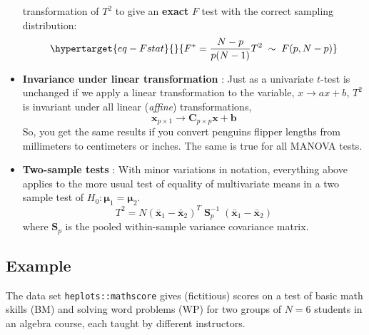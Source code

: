 \documentclass[
  letterpaper,
  10pt,
  krantz2]{krantz}
\makeatletter
\newenvironment{Shaded}{\begin{snugshade}}{\end{snugshade}}
\newcommand{\AttributeTok}[1]{\textcolor[rgb]{0.40,0.45,0.13}{#1}}
\newcommand{\CommentTok}[1]{\textcolor[rgb]{0.37,0.37,0.37}{#1}}
\newcommand{\FunctionTok}[1]{\textcolor[rgb]{0.28,0.35,0.67}{#1}}
\newcommand{\NormalTok}[1]{\textcolor[rgb]{0.00,0.23,0.31}{#1}}
\newcommand{\StringTok}[1]{\textcolor[rgb]{0.13,0.47,0.30}{#1}}
\newenvironment{kframe}{%
  \medskip{}
  \setlength{\fboxsep}{.8em}
  \def\at@end@of@kframe{}%
  \ifinner\ifhmode%
  \def\at@end@of@kframe{\end{minipage}}%
  \begin{minipage}{\columnwidth}%
  \fi\fi%
  \def\FrameCommand##1{\hskip\@totalleftmargin \hskip-\fboxsep
  \colorbox{shadecolor}{##1}\hskip-\fboxsep
      \hskip-\linewidth \hskip-\@totalleftmargin \hskip\columnwidth}%
  \MakeFramed {\advance\hsize-\width
    \@totalleftmargin\z@ \linewidth\hsize
    \@setminipage}}%
{\par\unskip\endMakeFramed%
  \at@end@of@kframe}
\renewenvironment{Shaded}{\begin{kframe}}{\end{kframe}}
\makeatother
\begin{document}
\begin{itemize}
  transformation of \(T^2\) to give an \textbf{exact} \(F\) test with
  the correct sampling distribution:
  \begin{equation}\protect\hypertarget{eq-Fstat}{}{
  F^* = \frac{N - p}{p (N-1)} T^2 \; \sim \; F (p, N - p)
  }\label{eq-Fstat}\end{equation}
\item
  \textbf{Invariance under linear transformation} : Just as a univariate
  \(t\)-test is unchanged if we apply a linear transformation to the
  variable, \(x \rightarrow a x + b\), \(T^2\) is invariant under all
  linear (\emph{affine}) transformations, \[
  \mathbf{x}_{p \times 1} \rightarrow \mathbf{C}_{p \times p} \mathbf{x} + \mathbf{b}
  \] So, you get the same results if you convert penguins flipper
  lengths from millimeters to centimeters or inches. The same is true
  for all MANOVA tests.
\item
  \textbf{Two-sample tests} : With minor variations in notation,
  everything above applies to the more usual test of equality of
  multivariate means in a two sample test of
  \(H_0 : \mathbf{\mu}_1 = \mathbf{\mu}_2\). \[
  T^2 = N (\bar{\mathbf{x}}_1 - \bar{\mathbf{x}}_2)^T \; \mathbf{S}_p^{-1} \; (\bar{\mathbf{x}}_1 - \bar{\mathbf{x}}_2)
  \] where \(\mathbf{S}_p\) is the pooled within-sample variance
  covariance matrix.
\end{itemize}

\hypertarget{example-1}{%
\subsection*{Example}\label{example-1}}

The data set \texttt{heplots::mathscore} gives (fictitious) scores on a
test of basic math skills (BM) and solving word problems (WP) for two
groups of \(N=6\) students in an algebra course, each taught by
different instructors.

\begin{Shaded}
\end{Shaded}
\end{document}
